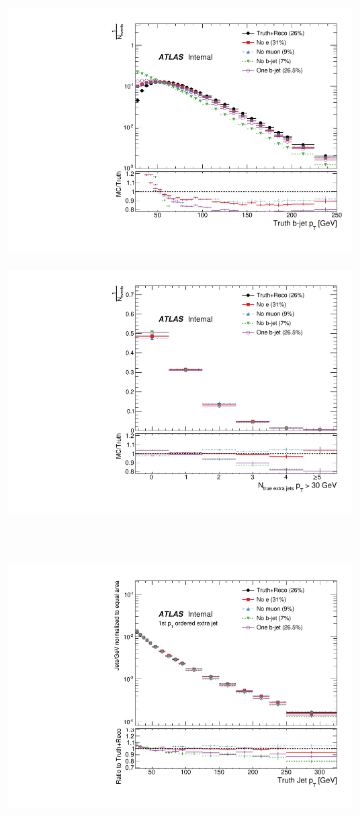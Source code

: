 \begin{figure}
\centering
\begin{subfigure}[]{0.45\textwidth}
\includegraphics[width=\textwidth]{fig/TruthNotReco/TruthBJetPt.pdf}
\end{subfigure}
\begin{subfigure}[]{0.45\textwidth}
\includegraphics[width=\textwidth]{fig/TruthNotReco/NTruthExtraJets30.pdf}
\end{subfigure}
\\
\begin{subfigure}[]{0.45\textwidth}
\includegraphics[width=\textwidth]{fig/TruthNotReco/TruthPtJet0.pdf}

\end{subfigure}
\end{figure}
